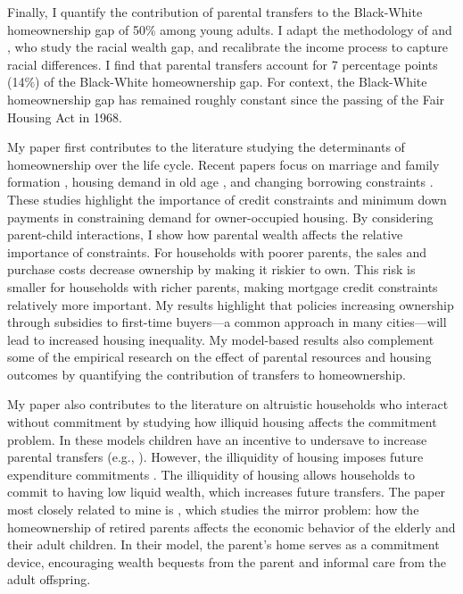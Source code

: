 \documentclass[12pt]{article}
\begin{document}
Finally, I quantify the contribution of parental transfers to the Black-White homeownership gap of 50\% among young adults. I adapt the methodology of \cite{Ashman2020} and \cite{aliprantis2022dynamics}, who study the racial wealth gap, and recalibrate the income process to capture racial differences. I find that parental transfers account for 7 percentage points (14\%) of the Black-White homeownership gap. For context, the Black-White homeownership gap has remained roughly constant since the passing of the Fair Housing Act in 1968.




My paper first contributes to the literature studying the determinants of homeownership over the life cycle. Recent papers focus on marriage and family formation \citep{Fisher2011,Chang2024,Khorunzhina2019}, housing demand in old age \citep{McGee2019,Barczyk2020a}, and changing borrowing constraints \citep{Paz-Pardo2019,Mabille2020}. These studies highlight the importance of credit constraints and minimum down payments in constraining demand for owner-occupied housing. By considering parent-child interactions, I show how parental wealth affects the relative importance of constraints. For households with poorer parents, the sales and purchase costs decrease ownership by making it riskier to own. This risk is smaller for households with richer parents, making mortgage credit constraints relatively more important. My results highlight that policies increasing ownership through subsidies to first-time buyers---a common approach in many cities---will lead to increased housing inequality. My model-based results also complement some of the empirical research on the effect of parental resources and housing outcomes \citep[see e.g.,][ for recent work]{wold2024housing,daysal2023intergenerational,benetton2022dynastic} by quantifying the contribution of transfers to homeownership.

My paper also contributes to the literature on altruistic households who interact without commitment by studying how illiquid housing affects the commitment problem. In these models children have an incentive to undersave to increase parental transfers (e.g., \citealp{Altonji1997a,Boar2018,Barczyk2014,Chu2020}). However, the illiquidity of housing imposes future expenditure commitments \citep{Chetty2007,Shore2010}. The illiquidity of housing allows households to commit to having low liquid wealth, which increases future transfers. The paper most closely related to mine is \cite{Barczyk2020a}, which studies the mirror problem: how the homeownership of retired parents affects the economic behavior of the elderly and their adult children. In their model, the parent’s home serves as a commitment device, encouraging wealth bequests from the parent and informal care from the adult offspring.
\end{document}
